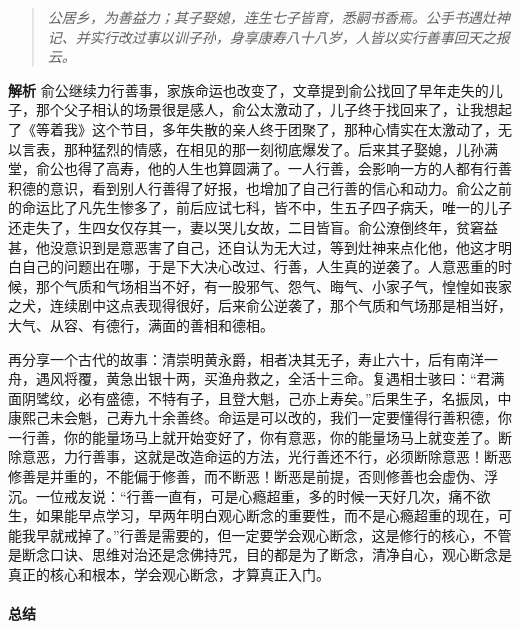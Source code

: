 \begin{quote}\it
    公居乡，为善益力；其子娶媳，连生七子皆育，悉嗣书香焉。公手书遇灶神记、并实行改过事以训子孙，身享康寿八十八岁，人皆以实行善事回天之报云。
\end{quote}

\textbf{解析} 俞公继续力行善事，家族命运也改变了，文章提到俞公找回了早年走失的儿子，那个父子相认的场景很是感人，俞公太激动了，儿子终于找回来了，让我想起了《等着我》这个节目，多年失散的亲人终于团聚了，那种心情实在太激动了，无以言表，那种猛烈的情感，在相见的那一刻彻底爆发了。后来其子娶媳，儿孙满堂，俞公也得了高寿，他的人生也算圆满了。一人行善，会影响一方的人都有行善积德的意识，看到别人行善得了好报，也增加了自己行善的信心和动力。俞公之前的命运比了凡先生惨多了，前后应试七科，皆不中，生五子四子病夭，唯一的儿子还走失了，生四女仅存其一，妻以哭儿女故，二目皆盲。俞公潦倒终年，贫窘益甚，他没意识到是意恶害了自己，还自认为无大过，等到灶神来点化他，他这才明白自己的问题出在哪，于是下大决心改过、行善，人生真的逆袭了。人意恶重的时候，那个气质和气场相当不好，有一股邪气、怨气、晦气、小家子气，惶惶如丧家之犬，连续剧中这点表现得很好，后来俞公逆袭了，那个气质和气场那是相当好，大气、从容、有德行，满面的善相和德相。

再分享一个古代的故事：清崇明黄永爵，相者决其无子，寿止六十，后有南洋一舟，遇风将覆，黄急出银十两，买渔舟救之，全活十三命。复遇相士骇曰：“君满面阴骘纹，必有盛德，不特有子，且登大魁，己亦上寿矣。”后果生子，名振凤，中康熙己未会魁，己寿九十余善终。命运是可以改的，我们一定要懂得行善积德，你一行善，你的能量场马上就开始变好了，你有意恶，你的能量场马上就变差了。断除意恶，力行善事，这就是改造命运的方法，光行善还不行，必须断除意恶！断恶修善是并重的，不能偏于修善，而不断恶！断恶是前提，否则修善也会虚伪、浮沉。一位戒友说：“行善一直有，可是心瘾超重，多的时候一天好几次，痛不欲生，如果能早点学习，早两年明白观心断念的重要性，而不是心瘾超重的现在，可能我早就戒掉了。”行善是需要的，但一定要学会观心断念，这是修行的核心，不管是断念口诀、思维对治还是念佛持咒，目的都是为了断念，清净自心，观心断念是真正的核心和根本，学会观心断念，才算真正入门。

\paragraph*{总结}

